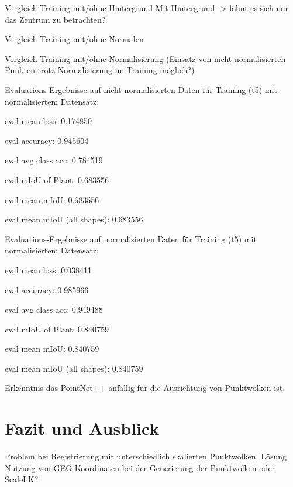 \documentclass[12pt,titlepage, twoside]{article}
\begin{document}
Vergleich Training mit/ohne Hintergrund
    Mit Hintergrund -> lohnt es sich nur das Zentrum zu betrachten?

Vergleich Training mit/ohne Normalen

Vergleich Training mit/ohne Normalisierung (Einsatz von nicht normalisierten Punkten trotz Normalisierung im Training möglich?)

Evaluations-Ergebnisse auf nicht normalisierten Daten für Training (t5) mit normalisiertem Datensatz:

eval mean loss: 0.174850

eval accuracy: 0.945604

eval avg class acc: 0.784519

eval mIoU of Plant:	 0.683556

eval mean mIoU: 0.683556

eval mean mIoU (all shapes): 0.683556



Evaluations-Ergebnisse auf normalisierten Daten für Training (t5) mit normalisiertem Datensatz:

eval mean loss: 0.038411

eval accuracy: 0.985966

eval avg class acc: 0.949488

eval mIoU of Plant:	 0.840759

eval mean mIoU: 0.840759

eval mean mIoU (all shapes): 0.840759



Erkenntnis das PointNet++ anfällig für die Ausrichtung von Punktwolken ist. 

\newpage
\section{Fazit und Ausblick}
\label{sec:fazit}
%

Problem bei Registrierung mit unterschiedlich skalierten Punktwolken. Lösung Nutzung von GEO-Koordinaten bei der Generierung der Punktwolken oder ScaleLK?
\end{document}
